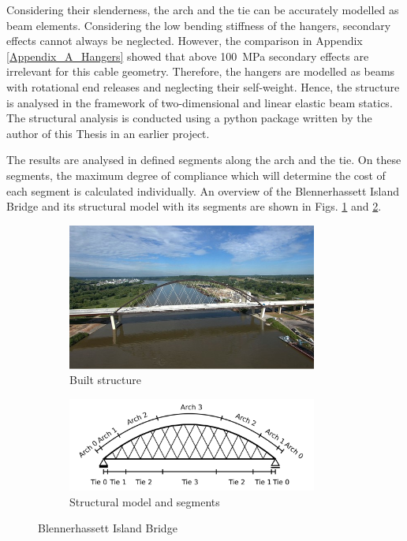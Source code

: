 Considering their slenderness, the arch and the tie can be accurately modelled as beam elements. Considering the low bending stiffness of the hangers, secondary effects cannot always be neglected. However, the comparison in Appendix \ref{Appendix_A_Hangers} showed that above \SI{100}{MPa} secondary effects are irrelevant for this cable geometry. Therefore, the hangers are modelled as beams with rotational end releases and neglecting their self-weight. Hence, the structure is analysed in the framework of two-dimensional and linear elastic beam statics. The structural analysis is conducted using a python package written by the author of this Thesis in an earlier project.\bigskip

The results are analysed in defined segments along the arch and the tie. On these segments, the maximum degree of compliance which will determine the cost of each segment is calculated individually. An overview of the Blennerhassett Island Bridge and its structural model with its segments are shown in Figs. \ref{fig:Blennerhassett2_a} and \ref{fig:fig:Blennerhassett2_b}.

\begin{figure}[H]
\centering
\begin{subfigure}{0.5\textwidth}
    \centering
    \includegraphics[width=0.9\textwidth]{overleaf/Pictures/Blennerhassett_2.jpg}
    \caption{Built structure}
    \label{fig:Blennerhassett2_a}
\end{subfigure}%
\begin{subfigure}{.5\textwidth}
    \centering
    \vspace*{0.67cm}
    \includegraphics[width=0.9\textwidth]{illustrations/figures/segments.png}
    \vspace*{0.67cm}
    \caption{Structural model and segments}
    \label{fig:fig:Blennerhassett2_b}
\end{subfigure}
\caption{Blennerhassett Island Bridge}
\label{fig:Blennerhassett2}
\end{figure}

